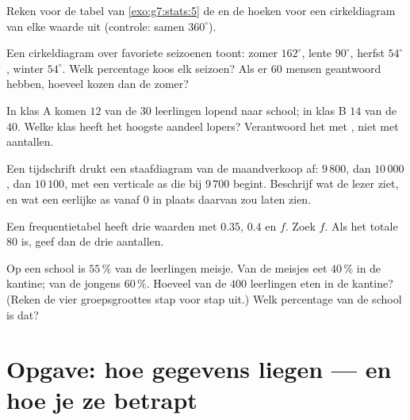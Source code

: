 \begin{exercise}[$\star$]\label{exo:g7:stats:6}
Reken voor de tabel van \cref{exo:g7:stats:5} de  en de hoeken voor een
cirkeldiagram van elke waarde uit (controle: samen $360^\circ$).
\end{exercise}

\begin{exercise}[$\star$]\label{exo:g7:stats:7}
Een cirkeldiagram over favoriete seizoenen toont: zomer $162^\circ$, lente
$90^\circ$, herfst $54^\circ$, winter $54^\circ$. Welk percentage koos elk seizoen?
Als er $60$ mensen geantwoord hebben, hoeveel kozen dan de zomer?
\end{exercise}

\begin{exercise}[$\star\star$]\label{exo:g7:stats:8}
In klas A komen $12$ van de $30$ leerlingen lopend naar school; in klas B $14$ van
de $40$. Welke klas heeft het hoogste aandeel lopers? Verantwoord het met
, niet met aantallen.
\end{exercise}

\begin{exercise}[$\star\star$]\label{exo:g7:stats:9}
Een tijdschrift drukt een staafdiagram van de maandverkoop af: $9\,800$, dan
$10\,000$, dan $10\,100$, met een verticale as die bij $9\,700$ begint. Beschrijf
wat de lezer ziet, en wat een eerlijke as vanaf $0$ in plaats daarvan zou laten
zien.
\end{exercise}

\begin{exercise}[$\star\star$]\label{exo:g7:stats:10}
Een frequentietabel heeft drie waarden met  $0.35$, $0.4$ en $f$. Zoek
$f$. Als het totale  $80$ is, geef dan de drie aantallen.
\end{exercise}

\begin{exercise}[$\star\star\star$]\label{exo:g7:stats:11}
Op een school is $55\,\%$ van de leerlingen meisje. Van de meisjes eet $40\,\%$ in
de kantine; van de jongens $60\,\%$. Hoeveel van de $400$ leerlingen eten in de
kantine? (Reken de vier groepsgroottes stap voor stap uit.) Welk percentage van de
school is dat?
\end{exercise}

\section{Opgave: hoe gegevens liegen --- en hoe je ze betrapt}

